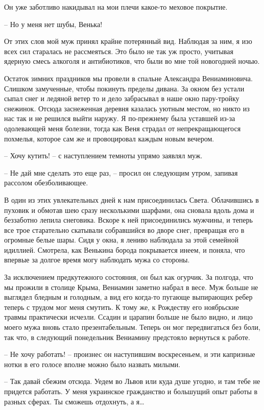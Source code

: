 \documentclass[
]{book}
\begin{document}
Он уже заботливо накидывал на мои плечи какое-то меховое покрытие.

-- Но у меня нет шубы, Венька!

От этих слов мой муж принял крайне потерянный вид. Наблюдая за ним, я изо всех сил старалась не рассмеяться. Это было не так уж просто, учитывая ядерную смесь алкоголя и антибиотиков, что были во мне той новогодней ночью.

Остаток зимних праздников мы провели в спальне Александра Вениаминовича. Слишком замученные, чтобы покинуть пределы дивана. За окном без устали сыпал снег и ледяной ветер то и дело забрасывал в наше окно пару-тройку снежинок. Отсюда заснеженная деревня казалась уютным местом, но никто из нас так и не решился выйти наружу. Я по-прежнему была уставшей из-за одолевающей меня болезни, тогда как Веня страдал от непрекращающегося похмелья, которое сам же и провоцировал каждым новым вечером.

-- Хочу кутить! -- с наступлением темноты упрямо заявлял муж.

-- Не дай мне сделать это еще раз, -- просил он следующим утром, запивая рассолом обезболивающее.

В один из этих увлекательных дней к нам присоединилась Света. Облачившись в пуховик и обмотав шею сразу несколькими шарфами, она сновала вдоль дома и беззаботно лепила снеговика. Вскоре к ней присоединились мужчины, и теперь все трое старательно скатывали собравшийся во дворе снег, превращая его в огромные белые шары. Сидя у окна, я лениво наблюдала за этой семейной идиллией. Смотрела, как Венькина борода покрывается инеем, и поняла, что впервые за долгое время могу наблюдать мужа со стороны.

За исключением предкутежного состояния, он был как огурчик. За полгода, что мы прожили в столице Крыма, Вениамин заметно набрал в весе. Муж больше не выглядел бледным и голодным, а вид его когда-то пугающе выпирающих ребер теперь с трудом мог меня смутить. К тому же, к Рождеству его ноябрьские травмы практически исчезли. Ссадин и царапин больше не было видно, и лицо моего мужа вновь стало презентабельным. Теперь он мог передвигаться без боли, так что, в следующий понедельник Вениамину предстояло вернуться к работе.

-- Не хочу работать! -- произнес он наступившим воскресеньем, и эти капризные нотки в его голосе вполне можно было назвать милыми.

-- Так давай сбежим отсюда. Уедем во Львов или куда душе угодно, и там тебе не придется работать. У меня украинское гражданство и большущий опыт работы в разных сферах. Ты сможешь отдохнуть, а я\ldots{}
\end{document}
